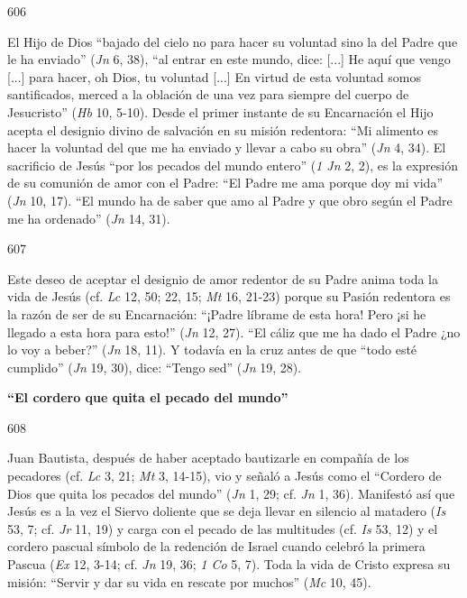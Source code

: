 			\begin{ccebody}\begin{ccenumber}606\end{ccenumber} El Hijo de Dios “bajado del cielo no para hacer su voluntad sino la del Padre que le ha enviado” (\textit{Jn} 6, 38), “al entrar en este mundo, dice: [...] He aquí que vengo [...] para hacer, oh Dios, tu voluntad [...] En virtud de esta voluntad somos santificados, merced a la oblación de una vez para siempre del cuerpo de Jesucristo” (\textit{Hb} 10, 5-10). Desde el primer instante de su Encarnación el Hijo acepta el designio divino de salvación en su misión redentora: “Mi alimento es hacer la voluntad del que me ha enviado y llevar a cabo su obra” (\textit{Jn} 4, 34). El sacrificio de Jesús “por los pecados del mundo entero” (\textit{1 Jn} 2, 2), es la expresión de su comunión de amor con el Padre: “El Padre me ama porque doy mi vida” (\textit{Jn} 10, 17). “El mundo ha de saber que amo al Padre y que obro según el Padre me ha ordenado” (\textit{Jn} 14, 31).\end{ccebody}
			
			\begin{ccebody}\begin{ccenumber}607\end{ccenumber} Este deseo de aceptar el designio de amor redentor de su Padre anima toda la vida de Jesús (cf. \textit{Lc} 12, 50; 22, 15; \textit{Mt} 16, 21-23) porque su Pasión redentora es la razón de ser de su Encarnación: “¡Padre líbrame de esta hora! Pero ¡si he llegado a esta hora para esto!” (\textit{Jn} 12, 27). “El cáliz que me ha dado el Padre ¿no lo voy a beber?” (\textit{Jn} 18, 11). Y todavía en la cruz antes de que “todo esté cumplido” (\textit{Jn} 19, 30), dice: “Tengo sed” (\textit{Jn} 19, 28).\end{ccebody}
			
			\begin{ccebody}\textbf{“El cordero que quita el pecado del mundo”}\end{ccebody}
			
			\begin{ccebody}\begin{ccenumber}608\end{ccenumber} Juan Bautista, después de haber aceptado bautizarle en compañía de los pecadores (cf. \textit{Lc} 3, 21; \textit{Mt} 3, 14-15), vio y señaló a Jesús como el “Cordero de Dios que quita los pecados del mundo” (\textit{Jn} 1, 29; cf. \textit{Jn} 1, 36). Manifestó así que Jesús es a la vez el Siervo doliente que se deja llevar en silencio al matadero (\textit{Is} 53, 7; cf. \textit{Jr} 11, 19) y carga con el pecado de las multitudes (cf. \textit{Is} 53, 12) y el cordero pascual símbolo de la redención de Israel cuando celebró la primera Pascua (\textit{Ex} 12, 3-14; cf. \textit{Jn} 19, 36; \textit{1 Co} 5, 7). Toda la vida de Cristo expresa su misión: “Servir y dar su vida en rescate por muchos” (\textit{Mc} 10, 45).\end{ccebody}
			
